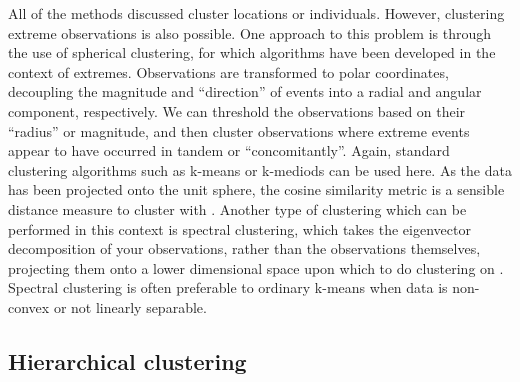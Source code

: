 \documentclass{article}
\numberwithin{equation}{section}
\begin{document}
All of the methods discussed cluster locations or individuals. 
However, clustering extreme observations is also possible. 
One approach to this problem is through the use of spherical clustering, for which algorithms have been developed in the context of extremes.
Observations are transformed to polar coordinates, decoupling the magnitude and ``direction'' of events into a radial and angular component, respectively.
We can threshold the observations based on their ``radius'' or magnitude, and then cluster observations where extreme events appear to have occurred in tandem or ``concomitantly''.
Again, standard clustering algorithms such as k-means or k-mediods can be used here.
As the data has been projected onto the unit sphere, the cosine similarity metric is a sensible distance measure to cluster with \citep{Fomichov2022, Janen2020, deCarvalho2024}.
Another type of clustering which can be performed in this context is spectral clustering, which takes the eigenvector decomposition of your observations, rather than the observations themselves, projecting them onto a lower dimensional space upon which to do clustering on \citep{Ng2001, Vonluxburg2007}.
Spectral clustering is often preferable to ordinary k-means when data is non-convex or not linearly separable. 

\subsection{Hierarchical clustering}
\end{document}
